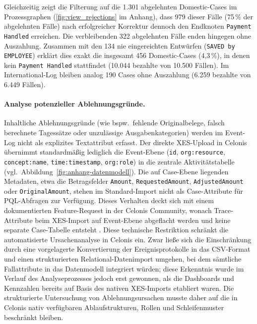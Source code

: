 Gleichzeitig zeigt die Filterung auf die 1.301 abgelehnten Domestic-Cases im Prozessgraphen (\autoref{fig:view_rejections} im Anhang), dass 979 dieser Fälle (75\,\% der abgelehnten Fälle) nach erfolgreicher Korrektur dennoch den Endknoten \texttt{Payment Handled} erreichen. Die verbleibenden 322 abgelehnten Fälle enden hingegen ohne Auszahlung. Zusammen mit den 134 nie eingereichten Entwürfen (\texttt{SAVED by EMPLOYEE}) erklärt dies exakt die insgesamt 456 Domestic-Cases (4,3\,\%), in denen kein \texttt{Payment Handled} stattfindet (10.044 bezahlte von 10.500 Fällen). Im International-Log bleiben analog 190 Cases ohne Auszahlung (6.259 bezahlte von 6.449 Fällen).

\paragraph{Analyse potenzieller Ablehnungsgründe.}
Inhaltliche Ablehnungsgründe (wie bspw.\ fehlende Originalbelege, falsch berechnete Tagessätze oder unzulässige Ausgabenkategorien) werden im Event-Log nicht als explizites Textattribut erfasst.
Der direkte XES-Upload in Celonis übernimmt standardmäßig lediglich die Event-Ebene (\texttt{id}, \texttt{org:resource}, \texttt{concept:name}, \texttt{time:timestamp}, \texttt{org:role}) in die zentrale Aktivitätstabelle (vgl.\ Abbildung~\ref{fig:anhang-datenmodell}).
Die auf Case-Ebene liegenden Metadaten, etwa die Betragsfelder \texttt{Amount}, \texttt{RequestedAmount}, \texttt{AdjustedAmount} oder \texttt{OriginalAmount}, stehen im Standard-Import nicht als Case-Attribute für PQL-Abfragen zur Verfügung.
Dieses Verhalten deckt sich mit einem dokumentierten Feature-Request in der Celonis Community, wonach Trace-Attribute beim XES-Import auf Event-Ebene abgeflacht werden und keine separate Case-Tabelle entsteht \parencite{buijs2019celonis}.
Diese technische Restriktion schränkt die automatisierte Ursachenanalyse in Celonis ein.
Zwar ließe sich die Einschränkung durch eine vorgelagerte Konvertierung der Ereignisprotokolle in das CSV-Format und einen strukturierten Relational-Datenimport umgehen, bei dem sämtliche Fallattribute in das Datenmodell integriert würden; diese Erkenntnis wurde im Verlauf des Analyseprozesses jedoch erst gewonnen, als die Dashboards und Kennzahlen bereits auf Basis des nativen XES-Imports etabliert waren.
Die strukturierte Untersuchung von Ablehnungsursachen musste daher auf die in Celonis nativ verfügbaren Ablaufstrukturen, Rollen und Schleifenmuster beschränkt bleiben.

